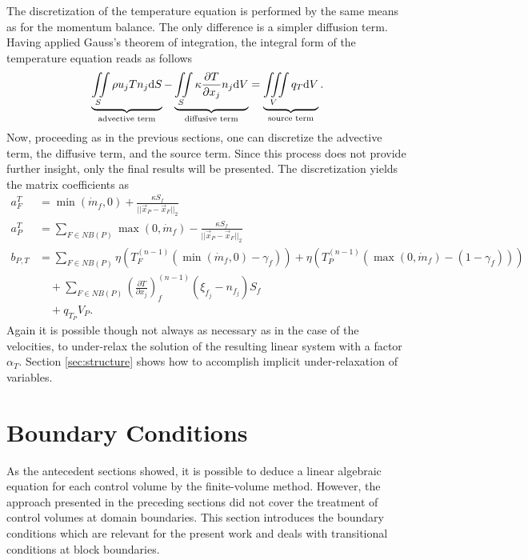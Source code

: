 The discretization of the temperature equation is performed by the same means as for the momentum balance. The only difference is a simpler diffusion term. Having applied Gauss's theorem of integration, the integral form of the temperature equation reads as follows
\begin{displaymath}
  \underbrace{ \iint\limits_S \rho u_j T n_j \mathrm{d}S }_{\text{advective term}}
  - \underbrace{ \iint\limits_S \kappa \frac{\partial T}{\partial x_j} n_j \mathrm{d}V }_{\text{diffusive term}}
  = \underbrace{\iiint\limits_V \vphantom{\frac{ T}{ x_j} } q_T \mathrm{d}V }_{\text{source term}}.
\end{displaymath}
Now, proceeding as in the previous sections, one can discretize the advective term, the diffusive term, and the source term. Since this process does not provide further insight, only the final results will be presented. The discretization yields the matrix coefficients as
  \begin{align*}
    a_F^{T} &= \min(\dot{m}_f,0) + \frac{\kappa S_f}{||\vec{x}_P - \vec{x}_F||_2} \\[1em]
    a_P^{T} &= \sum_{F \in NB(P)}\max(0,\dot{m}_f) - \frac{\kappa S_f}{||\vec{x}_P - \vec{x}_F||_2} \\[1em]
    b_{P,T} &= \sum_{F \in NB(P)} \eta  \left(T_F^{(n-1)} \left( \min(\dot{m}_f,0) - \gamma_f \right)\right) 
             + \eta \left( T_{P}^{(n-1)} \left( \max(0,\dot{m}_f) - \left(1 - \gamma_f\right) \right)\right) \nonumber \\[0.5em]
            &\quad + \sum_{F \in NB(P)} \left( \frac{\partial T}{\partial x_j}\right)_f^{(n-1)} \left(\xi_{f_j} - n_{f_j}\right)S_f \nonumber \\[0.5em]
            &\quad + q_{T_P} V_P.
  \end{align*}
Again it is possible though not always as necessary as in the case of the velocities, to under-relax the solution of the resulting linear system with a factor \(\alpha_T\). Section \ref{sec:structure} shows how to accomplish implicit under-relaxation of variables.

\section{Boundary Conditions}
\label{sec:segboundary}

As the antecedent sections showed, it is possible to deduce a linear algebraic equation for each control volume by the finite-volume method. However, the approach presented in the preceding sections did not cover the treatment of control volumes at domain boundaries. This section introduces the boundary conditions which are relevant for the present work and deals with transitional conditions at block boundaries.

